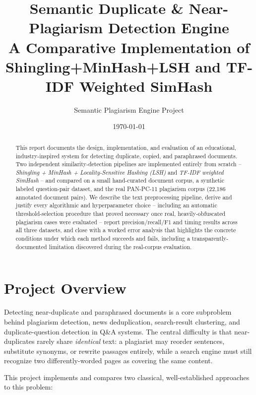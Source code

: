 \documentclass[11pt]{article}
\title{\textbf{Semantic Duplicate \& Near-Plagiarism Detection Engine}\\[0.3em]
\large A Comparative Implementation of Shingling+MinHash+LSH and TF-IDF Weighted SimHash}
\author{Semantic Plagiarism Engine Project}
\date{\today}
\begin{document}
\maketitle

\begin{abstract}
This report documents the design, implementation, and evaluation of an educational, industry-inspired
system for detecting duplicate, copied, and paraphrased documents. Two independent similarity-detection
pipelines are implemented entirely from scratch -- \emph{Shingling + MinHash + Locality-Sensitive Hashing
(LSH)} and \emph{TF-IDF weighted SimHash} -- and compared on a small hand-curated document corpus, a
synthetic labeled question-pair dataset, and the real PAN-PC-11 plagiarism corpus (22{,}186 annotated
document pairs). We describe the text preprocessing pipeline, derive and justify every algorithmic and
hyperparameter choice -- including an automatic threshold-selection procedure that proved necessary once
real, heavily-obfuscated plagiarism cases were evaluated -- report precision/recall/F1 and timing results
across all three datasets, and close with a worked error analysis that highlights the concrete conditions
under which each method succeeds and fails, including a transparently-documented limitation discovered
during the real-corpus evaluation.
\end{abstract}

\tableofcontents

\section{Project Overview}

Detecting near-duplicate and paraphrased documents is a core subproblem behind plagiarism detection,
news deduplication, search-result clustering, and duplicate-question detection in Q\&A systems. The
central difficulty is that near-duplicates rarely share \emph{identical} text: a plagiarist may reorder
sentences, substitute synonyms, or rewrite passages entirely, while a search engine must still recognize
two differently-worded pages as covering the same content.

This project implements and compares two classical, well-established approaches to this problem:
\end{document}
